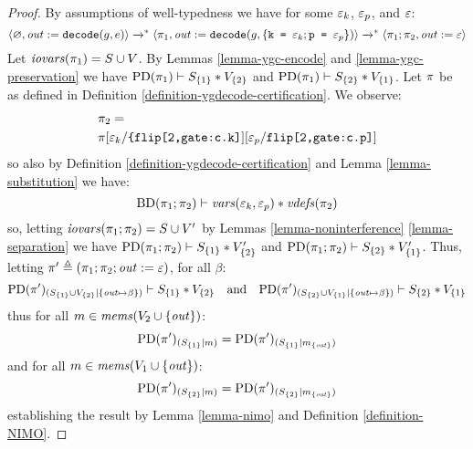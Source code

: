 \begin{proof}
  By assumptions of well-typedness we
  have for some $\varepsilon_k$, $\varepsilon_p$, and $\varepsilon$:
  $$
  \langle \varnothing,\mathit{out} := \texttt{decode}(g,e) \rangle \xrightarrow{}^{*}
  \langle \pi_1,\mathit{out} := \texttt{decode}(g,\{ \texttt{k = }\varepsilon_k;  \texttt{p = }\varepsilon_p\}) \rangle
  \xrightarrow{}^{*} \langle \pi_1;\pi_2,\mathit{out} := \varepsilon \rangle
  $$
  Let $\mathit{iovars}(\pi_1) = S \cup V$.
  By Lemmas \ref{lemma-ygc-encode} and \ref{lemma-ygc-preservation} we
  have $\mathrm{PD}(\pi_1) \vdash S_{\{1\}} * V_{\{2\}}$ and
  $\mathrm{PD}(\pi_1) \vdash S_{\{2\}} * V_{\{1\}}$.
  Let $\pi$ be as defined in Definition \ref{definition-ygdecode-certification}.
  We observe:
  \begin{eqnarray*}
    & \pi_2 = \\ 
    & \pi[\varepsilon_k/\texttt{\{flip[2,gate:c.k]}][\varepsilon_p/\texttt{flip[2,gate:c.p]}]
  \end{eqnarray*}
  so also by  Definition \ref{definition-ygdecode-certification} and
  Lemma \ref{lemma-substitution} we have:
  $$
  \mathrm{BD}(\pi_1;\pi_2) \vdash \mathit{vars}(\varepsilon_k,\varepsilon_p) * \mathit{vdefs}(\pi_2)
  $$
  so, letting $\mathit{iovars}(\pi_1;\pi_2) = S \cup V'$ by
  Lemmas \ref{lemma-noninterference} \ref{lemma-separation} we have
  $\mathrm{PD}(\pi_1;\pi_2) \vdash S_{\{1\}} * V'_{\{2\}}$ and
  $\mathrm{PD}(\pi_1;\pi_2) \vdash S_{\{2\}} * V'_{\{1\}}$.
  Thus, letting $\pi' \triangleq (\pi_1;\pi_2;\mathit{out} := \varepsilon)$, for all $\beta$:
  $$\mathrm{PD}(\pi')_{({S_{\{1\}} \cup V_{\{2\}}}|{\{ \mathit{out} \mapsto \beta \}})} \vdash S_{\{1\}} * V_{\{2\}}
  \quad \text{and} \quad
    \mathrm{PD}(\pi')_{({S_{\{2\}} \cup V_{\{1\}}}|{\{ \mathit{out} \mapsto \beta \}})} \vdash S_{\{2\}} * V_{\{1\}}$$
  thus for all $m \in \mathit{mems}(V_2 \cup \{ \mathit{out} \})$:
  $$\mathrm{PD}(\pi')_{({S_{\{1\}}}|{m})}
  = \mathrm{PD}(\pi')_{({S_{\{1\}}}|{m_{\{\mathit{out}\}}})}$$
  and for all $m \in \mathit{mems}(V_1 \cup \{ \mathit{out} \})$:
  $$\mathrm{PD}(\pi')_{({S_{\{2\}}}|{m})}
  = \mathrm{PD}(\pi')_{({S_{\{2\}}}|{m_{\{\mathit{out}\}}})}$$
  establishing the result by Lemma \ref{lemma-nimo} and Definition \ref{definition-NIMO}.
\end{proof}
